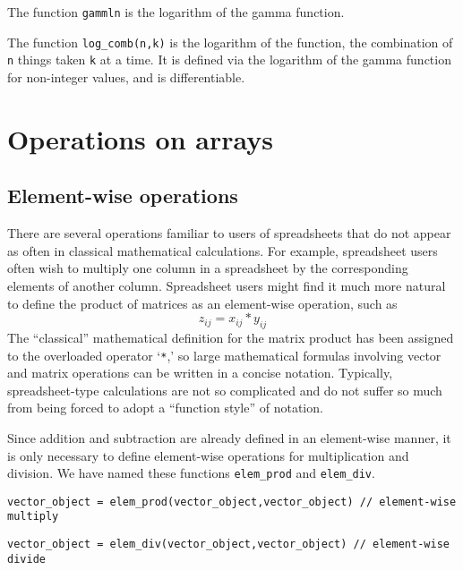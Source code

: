 The function \texttt{gammln} is the logarithm of the gamma function.

The function \texttt{log\_comb(n,k)} is the logarithm of the  function,
the combination of \texttt{n} things taken \texttt{k} at a time.
It is defined via the logarithm of the gamma function 
for non-integer values,
and is differentiable.



\section{Operations on arrays}

\subsection{Element-wise operations}

There are several operations familiar to users of spreadsheets that do
not appear as often in classical mathematical
calculations. For example, spreadsheet users often
wish to multiply one column in a spreadsheet by the corresponding
elements of another column. Spreadsheet users might find it much more
natural to define the product of matrices as an element-wise operation,
such as
$$z_{ij}= x_{ij}*y_{ij}$$
The ``classical'' mathematical definition for the
matrix product has been assigned to the overloaded operator `\texttt{*},'
so large mathematical formulas involving
vector and matrix operations can be written in a concise notation.
Typically, spreadsheet-type calculations are not so complicated
and do not suffer so much from being forced to adopt a
``function style'' of notation.

Since addition and subtraction are already defined in an element-wise manner,
it is only necessary to define element-wise operations 
for multiplication and
division. We have named these functions \texttt{elem\_prod} and \texttt{elem\_div}.

\begin{lstlisting}
vector_object = elem_prod(vector_object,vector_object) // element-wise multiply 
\end{lstlisting}

\begin{lstlisting}
vector_object = elem_div(vector_object,vector_object) // element-wise divide
\end{lstlisting}

